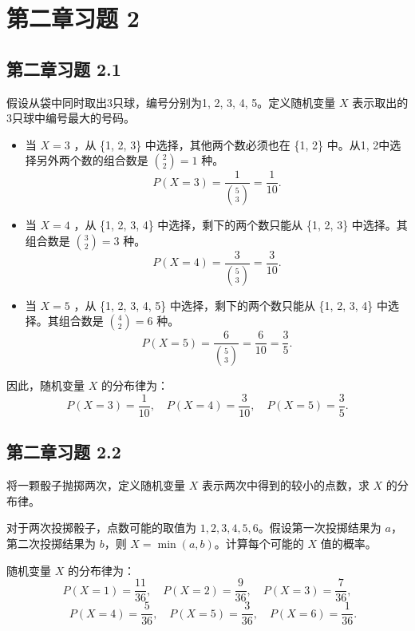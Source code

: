 \documentclass[twoside]{article}
\begin{document}
\maketitle
\vspace{-3.5em}

\tableofcontents
    
\section{第二章习题 2}

\subsection{第二章习题 2.1}
\begin{ans}{2.1}{2.1}
假设从袋中同时取出3只球，编号分别为1, 2, 3, 4, 5。定义随机变量 \( X \) 表示取出的3只球中编号最大的号码。

\begin{itemize}
    \item 当 \( X = 3 \) ，从 \{1, 2, 3\} 中选择，其他两个数必须也在 \{1, 2\} 中。从1, 2中选择另外两个数的组合数是 \( \binom{2}{2} = 1 \) 种。
    \[
    P(X = 3) = \frac{1}{\binom{5}{3}} = \frac{1}{10}.
    \]

    \item 当 \( X = 4 \) ，从 \{1, 2, 3, 4\} 中选择，剩下的两个数只能从 \{1, 2, 3\} 中选择。其组合数是 \( \binom{3}{2} = 3 \) 种。
    \[
    P(X = 4) = \frac{3}{\binom{5}{3}} = \frac{3}{10}.
    \]

    \item 当 \( X = 5 \) ，从 \{1, 2, 3, 4, 5\} 中选择，剩下的两个数只能从 \{1, 2, 3, 4\} 中选择。其组合数是 \( \binom{4}{2} = 6 \) 种。
    \[
    P(X = 5) = \frac{6}{\binom{5}{3}} = \frac{6}{10} = \frac{3}{5}.
    \]
\end{itemize}

因此，随机变量 \( X \) 的分布律为：
\[
P(X = 3) = \frac{1}{10}, \quad P(X = 4) = \frac{3}{10}, \quad P(X = 5) = \frac{3}{5}.
\]

\end{ans}

\subsection{第二章习题 2.2}

将一颗骰子抛掷两次，定义随机变量 \( X \) 表示两次中得到的较小的点数，求 \( X \) 的分布律。

\begin{ans}{2.2}{2.2}
对于两次投掷骰子，点数可能的取值为 \( 1, 2, 3, 4, 5, 6 \)。假设第一次投掷结果为 \( a \)，第二次投掷结果为 \( b \)，则 \( X = \min(a, b) \)。计算每个可能的 \( X \) 值的概率。

随机变量 \( X \) 的分布律为：
\[
P(X = 1) = \frac{11}{36}, \quad P(X = 2) = \frac{9}{36}, \quad P(X = 3) = \frac{7}{36}, 
\]
\[
\quad P(X = 4) = \frac{5}{36}, \quad P(X = 5) = \frac{3}{36}, \quad P(X = 6) = \frac{1}{36}.
\]

\end{ans}
\end{document}
